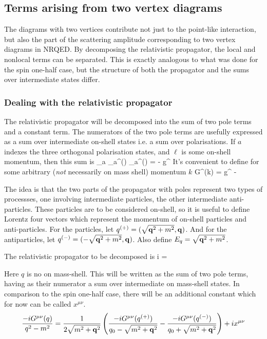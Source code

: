 \subsection{Terms arising from two vertex diagrams}

The diagrams with two vertices contribute not just to the point-like interaction, but also the part of the scattering amplitude corresponding to two vertex diagrams in NRQED.  By decomposing the relativistic propagator, the local and nonlocal terms can be separated.  This is exactly analogous to what was done for the spin one-half case, but the structure of both  the propagator and the sums over intermediate states differ.  

\subsubsection{Dealing with the relativistic propagator}

The relativistic propagator will be decomposed into the sum of two pole terms and a constant term.  The numerators of the two pole terms are usefully expressed as a sum over intermediate on-shell states i.e. a sum over polarisations. If $a$ indexes the three orthogonal polarisation states, and $\ell$ is some on-shell momentum, then this sum is
\beq
	\sum_a \W_a^\mu(\ell) \W_a^\nu(\ell) =  - g^{\mu\nu} 
\eeq
It's convenient to define for some arbitrary (\emph{not} necessarily on mass shell) momentum $k$
\beq
  G^{\mu\nu}(k) = g^{\mu\nu} - 
\eeq

The idea is that the two parts of the propagator with poles represent two types of processses, one involving intermediate particles, the other intermediate anti-particles.  These particles are to be considered on-shell, so it is useful to define Lorentz four vectors which represent the momentum of on-shell particles and anti-particles.  For the particles, let $q^{(+)}{} = (\sqrt{\mathbf{q}^2+m^2}, \mathbf{q})$.   And for the antiparticles, let $q^{(-)}{} = (-\sqrt{\mathbf{q}^2+m^2}, \mathbf{q})$.  Also define $E_q = \sqrt{\mathbf{q}^2+m^2}$.

The relativistic propagator to be decomposed is
\beq
	i = 
\eeq

Here $q$ is no on mass-shell.  This will be written as the sum of two pole terms, having as their numerator a sum over intermediate on mass-shell states.  In comparison to the spin one-half case, there will be an additional constant which for now can be called $x^{\mu\nu}$.
\[
	\frac{ -i G^{\mu\nu}(q) }{q^2 - m^2} = \frac{1}{2 \sqrt{ m^2 + \mathbf{q}^2 }} \left(  \frac{ -i G^{\mu\nu}(q^{(+)}{})  }{q_0 - \sqrt{ m^2 + \mathbf{q}^2 } } - \frac{ -i G^{\mu\nu}(q^{(-)}{})  }{q_0 + \sqrt{ m^2 + \mathbf{q}^2 } } \right) + i x^{\mu\nu}
\]

